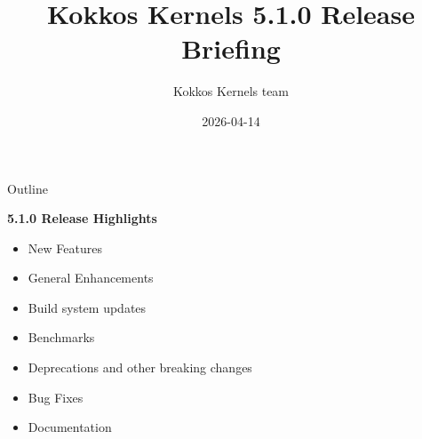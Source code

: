 
\usepackage{tikz}
\graphicspath{{kk_4_5/figures/}}

\def\sandid{SAND2026-19828PE}

\title{Kokkos Kernels 5.1.0 Release Briefing}

\author{Kokkos Kernels team}

\date{2026-04-14}



\shorttrue
\mediumfalse
\fullfalse



\begin{frame}
  \titlepage
\end{frame}


\begin{frame}[fragile]{Outline}

  \textbf{5.1.0 Release Highlights}

  \begin{itemize}
    \item{New Features}
    \item{General Enhancements}
    \item{Build system updates}
    \item{Benchmarks}
    \item{Deprecations and other breaking changes}
    \item{Bug Fixes}
    \item{Documentation}
  \end{itemize}

\end{frame}

